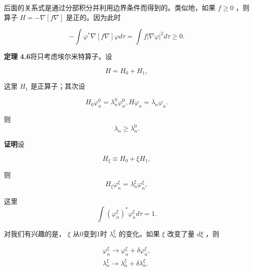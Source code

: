 后面的关系式是通过分部积分并利用边界条件而得到的。类似地，如果 $f \geqslant 0$ ，则算子 $H = -\nabla [f\nabla ]$ 是正的。因为此时

\begin{equation*}
- \int \varphi^ {*} \nabla [ f \nabla ] \varphi d \tau = \int f | \nabla \varphi | ^ {2} d \tau \geqslant 0.
\end{equation*}

\textbf{定理 4.6}\quad 将只考虑埃尔米特算子。设

\begin{equation*}
H = H _ {0} + H _ {1},\tag{4.49}
\end{equation*}

这里 $H_{1}$ 是正算子；其次设

\begin{equation*}
H _ {0} \varphi_ {n} ^ {0} = \lambda_ {n} ^ {0} \varphi_ {n} ^ {0}, H \varphi_ {n} = \lambda_ {n} \varphi_ {n}.\tag{4.50}
\end{equation*}

则
\begin{equation*}
\lambda_ {n} \geqslant \lambda_ {n} ^ {0}.\tag{4.51}
\end{equation*}

\textbf{证明}\quad 设

\begin{equation*}
H _ {\xi} \equiv H _ {0} + \xi H _ {1},\tag{4.52}
\end{equation*}

则
\begin{equation*}
H _ {\xi} \varphi_ {n} ^ {\xi} = \lambda_ {n} ^ {\xi} \varphi_ {n} ^ {\xi},\tag{4.53}
\end{equation*}

这里
\begin{equation*}
\int \left(\varphi_ {n} ^ {\xi}\right) ^ {*} \varphi_ {n} ^ {\xi} d \tau = 1.
\end{equation*}

对我们有兴趣的是， $\xi$ 从0变到1时 $\lambda_{n}^{\xi}$ 的变化。如果 $\xi$ 改变了量 $d\xi$ ，则

\begin{equation*}
\begin{array}{l} \varphi_ {n} ^ {\xi} \longrightarrow \varphi_ {n} ^ {\xi} + \delta \varphi_ {n} ^ {\xi}, \\ \lambda_ {n} ^ {\xi} \longrightarrow \lambda_ {n} ^ {\xi} + \delta \lambda_ {n} ^ {\xi}. \end{array}\tag{4.54}
\end{equation*}

